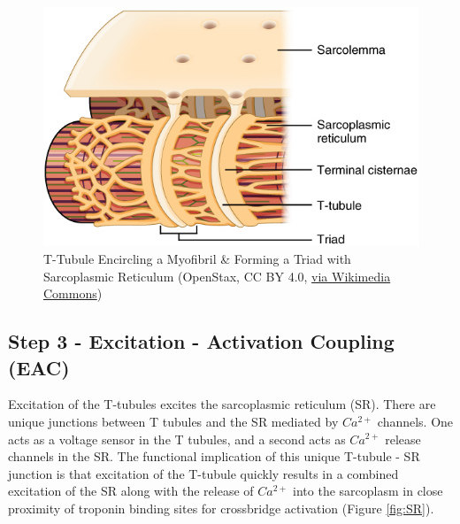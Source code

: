 \begin{figure}[!ht]
    \centering
    \includegraphics[width=1\linewidth]{./figure/T-tubule.jpg}
    \caption{T-Tubule Encircling a Myofibril \& Forming a Triad with Sarcoplasmic Reticulum  \footnotesize{(OpenStax, CC BY 4.0, \href{https://creativecommons.org/licenses/by/4.0}{via Wikimedia Commons})}}
    \label{fig:T-tubule}
\end{figure}

\subsection{Step 3 - Excitation - Activation Coupling (EAC)}
Excitation of the T-tubules excites the sarcoplasmic reticulum (SR). There are unique junctions between T tubules and the SR mediated by $Ca^{2+}$ channels. One acts as a voltage sensor in the T tubules, and a second acts as $Ca^{2+}$ release channels in the SR.\footnotemark{} The functional implication of this unique T-tubule - SR junction is that excitation of the T-tubule quickly results in a combined excitation of the SR along with the release of $Ca^{2+}$ into the sarcoplasm\footnotemark{} in close proximity of troponin binding sites for crossbridge activation (Figure \ref{fig:SR}).

